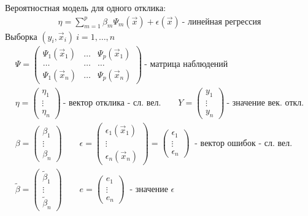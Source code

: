\documentclass{article}
\begin{document}
Вероятностная модель для одного отклика:
\begin{gather*}
  \eta = \sum_{m=1}^{p}\beta_m\Psi_m(\vec{x}) + \epsilon(\vec{x}) \ \text{- линейная регрессия}
\end{gather*}
Выборка $(y_i,\vec{x}_i) \ i=1,\dots ,n$
\begin{gather*}
  \Psi = \begin{pmatrix}
    \Psi_1(\vec{x}_1) & \dots & \Psi_p(\vec{x}_1) \\ 
    \dots & \dots & \dots \\ 
    \Psi_1(\vec{x}_n) & \dots & \Psi_p(\vec{x}_n)
  \end{pmatrix} \ \text{- матрица наблюдений} \\ 
  \eta = \begin{pmatrix}
    \eta_1 \\ \vdots \\ \eta_n
  \end{pmatrix} \ \text{- вектор отклика - сл. вел.} \qquad
  Y = \begin{pmatrix}
    y_1 \\ \vdots \\ y_n
  \end{pmatrix} \ \text{- значение век. откл.} \\ 
  \beta = \begin{pmatrix}
    \beta_1 \\ \vdots \\ \beta_n
  \end{pmatrix} \qquad 
  \epsilon = \begin{pmatrix}
    \epsilon_1(\vec{x}_1) \\ \vdots \\ \epsilon_n(\vec{x}_n)
  \end{pmatrix} = \begin{pmatrix}
    \epsilon_1 \\ \vdots \\ \epsilon_n
  \end{pmatrix} \ \text{ - вектор ошибок - сл. вел.} \\ 
  \tilde\beta = \begin{pmatrix}
    \tilde\beta_1 \\ \vdots \\ \tilde\beta_n
  \end{pmatrix} \qquad 
  e = \begin{pmatrix}
    e_1 \\ \vdots \\ e_n
  \end{pmatrix}  \ \text{ - значение } \epsilon
\end{gather*}
\end{document}
